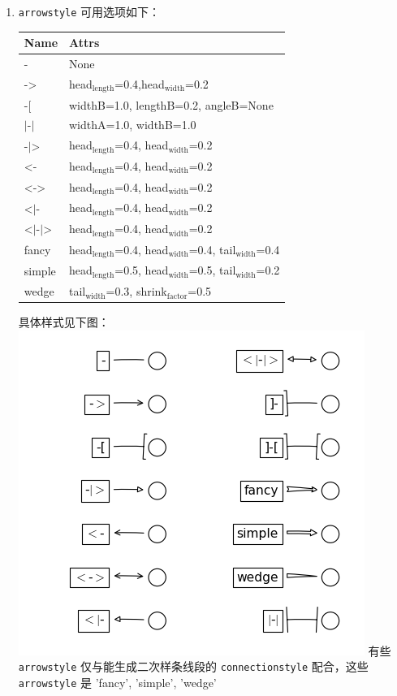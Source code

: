 \documentclass[11pt]{ctexart}
\begin{document}
\begin{enumerate}
\begin{enumerate}
\begin{enumerate}
\item \texttt{arrowstyle} 可用选项如下：
\begin{center}
\begin{tabular}{ll}
Name & Attrs\\
\hline
- & None\\
-> & head\(_{\text{length}}\)=0.4,head\(_{\text{width}}\)=0.2\\
-[ & widthB=1.0, lengthB=0.2, angleB=None\\
\(\vert{}\)-\(\vert{}\) & widthA=1.0, widthB=1.0\\
-\(\vert{}\)> & head\(_{\text{length}}\)=0.4, head\(_{\text{width}}\)=0.2\\
<- & head\(_{\text{length}}\)=0.4, head\(_{\text{width}}\)=0.2\\
<-> & head\(_{\text{length}}\)=0.4, head\(_{\text{width}}\)=0.2\\
<\(\vert{}\)- & head\(_{\text{length}}\)=0.4, head\(_{\text{width}}\)=0.2\\
<\(\vert{}\)-\(\vert{}\)> & head\(_{\text{length}}\)=0.4, head\(_{\text{width}}\)=0.2\\
fancy & head\(_{\text{length}}\)=0.4, head\(_{\text{width}}\)=0.4, tail\(_{\text{width}}\)=0.4\\
simple & head\(_{\text{length}}\)=0.5, head\(_{\text{width}}\)=0.5, tail\(_{\text{width}}\)=0.2\\
wedge & tail\(_{\text{width}}\)=0.3, shrink\(_{\text{factor}}\)=0.5\\
\end{tabular}
\end{center}
具体样式见下图：
\includegraphics[width=.9\linewidth]{figs/annotation_05.png}
有些 \texttt{arrowstyle} 仅与能生成二次样条线段的 \texttt{connectionstyle} 配合，这些 \texttt{arrowstyle} 是
'fancy', 'simple', 'wedge'
\end{enumerate}
\end{enumerate}
\end{enumerate}
\end{document}
